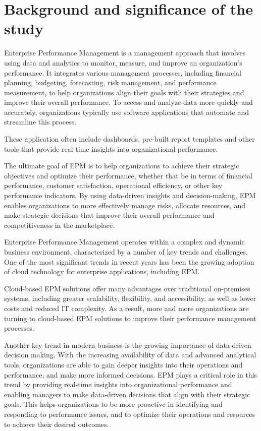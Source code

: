 \documentclass[12pt,a4paper,openright,twoside]{book}
\begin{document}
\section{Background and significance of the study}

Enterprise Performance Management is a management approach that involves using data and analytics to monitor, measure, and improve an organization's performance. 
%
It integrates various management processes, including financial planning, budgeting, forecasting, risk management, and performance measurement, to help organizations align their goals with their strategies and improve their overall performance.
%
To access and analyze data more quickly and accurately, organizations typically use software applications that automate and streamline this process.

These application often include dashboards, pre-built report templates and other tools that provide real-time insights into organizational performance.

The ultimate goal of EPM is to help organizations to achieve their strategic objectives and optimize their performance, whether that be in terms of financial performance, customer satisfaction, operational efficiency, or other key performance indicators. 
%
By using data-driven insights and decision-making, EPM enables organizations to more effectively manage risks, allocate resources, and make strategic decisions that improve their overall performance and competitiveness in the marketplace.

Enterprise Performance Management operates within a complex and dynamic business environment, characterized by a number of key trends and challenges. 
%
One of the most significant trends in recent years has been the growing adoption of cloud technology for enterprise applications, including EPM. 

Cloud-based EPM solutions offer many advantages over traditional on-premises systems, including greater scalability, flexibility, and accessibility, as well as lower costs and reduced IT complexity. 
%
As a result, more and more organizations are turning to cloud-based EPM solutions to improve their performance management processes.

Another key trend in modern business is the growing importance of data-driven decision making. 
%
With the increasing availability of data and advanced analytical tools, organizations are able to gain deeper insights into their operations and performance, and make more informed decisions. 
%
EPM plays a critical role in this trend by providing real-time insights into organizational performance and enabling managers to make data-driven decisions that align with their strategic goals. 
%
This helps organizations to be more proactive in identifying and responding to performance issues, and to optimize their operations and resources to achieve their desired outcomes.
\end{document}
